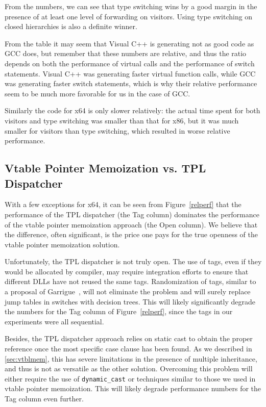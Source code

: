 \documentclass[preprint]{sigplanconf}
\makeatletter
\DeclareRobustCommand{\code}[1]{{\lstinline[breaklines=false,escapechar=@]{#1}}}
\makeatother
\begin{document}
From the numbers, we can see that type switching wins by a good margin in 
the presence of at least one level of forwarding on visitors. Using type 
switching on closed hierarchies is also a definite winner.

From the table it may seem that Visual C++ is generating not as good code as GCC 
does, but remember that these numbers are relative, and thus the ratio depends on  
both the performance of virtual calls and the performance of switch statements. Visual 
C++ was generating faster virtual function calls, while GCC was generating 
faster switch statements, which is why their relative performance seem to be much 
more favorable for us in the case of GCC.

Similarly the code for x64 is only slower relatively: the actual time spent for 
both visitors and type switching was smaller than that for x86, but it was much 
smaller for visitors than type switching, which resulted in worse relative 
performance.

\subsection{Vtable Pointer Memoization vs. TPL Dispatcher}
\label{sec:cmp}

With a few exceptions for x64, it can be seen from Figure~\ref{relperf} 
that the performance of the TPL dispatcher (the Tag column) dominates the 
performance of the vtable pointer memoization approach (the Open column). We believe 
that the difference, often significant, is the price one pays for the true 
openness of the vtable pointer memoization solution.

Unfortunately, the TPL dispatcher is not truly open. The use of tags, 
even if they would be allocated by compiler, may require integration efforts to 
ensure that different DLLs have not reused the same tags. Randomization of tags,
similar to a proposal of Garrigue~\cite{garrigue-98}, will not eliminate the 
problem and will surely replace jump tables in switches with decision trees. This 
will likely significantly degrade the numbers for the Tag column of 
Figure~\ref{relperf}, since the tags in our experiments were all sequential.

Besides, the TPL dispatcher approach relies on static cast to obtain the 
proper reference once the most specific case clause has been found. As we 
described in \textsection\ref{sec:vtblmem}, this has severe limitations in the 
presence of multiple inheritance, and thus is not as versatile as the other 
solution. Overcoming this problem will either require the use of 
\code{dynamic_cast} or techniques similar to those we used in vtable pointer 
memoization. This will likely degrade performance numbers for the Tag column even further.
\end{document}
